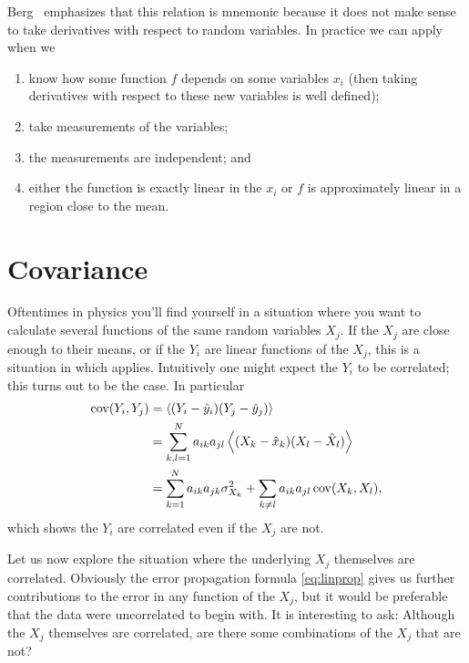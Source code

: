 Berg~\cite{berg_markov_2004} emphasizes that this relation is 
mnemonic because it does not make 
sense to take derivatives with respect to random variables. 
In practice we can apply  when we
\begin{enumerate}
  \item know how some function $f$ depends on some variables $x_i$
        (then taking derivatives with respect to these new variables
         is well defined);
  \item take measurements of the variables;
  \item the measurements are independent; and
  \item either the function is exactly linear in the $x_i$ or $f$ is
        approximately linear in a region close to the mean.
\end{enumerate}

\section{Covariance}

Oftentimes in physics you'll find yourself in a situation where you want
to calculate several functions of the same random variables $X_j$. If
the $X_j$ are close enough to their means, or if the $Y_i$ are linear
functions of the $X_j$, this is a situation in which  
applies. Intuitively one might expect the $Y_i$ to be correlated; this
turns out to be the case. In particular
\begin{equation}
  \begin{aligned}
    \Cov(Y_i,Y_j)&=\ev{(Y_i-\hat{y}_i)(Y_j-\hat{y}_j)}\\
                 &=\sum_{k,l=1}^N 
                  a_{ik}a_{jl}\ev{(X_k-\hat{x}_k)(X_l-\hat{X}_l)}\\
                 &=\sum_{k=1}^N a_{ik}a_{jk}\sigma^2_{X_k}
                   +\sum_{k\neq l} a_{ik}a_{jl}\Cov(X_k,X_l),
  \end{aligned}
\end{equation}
which shows the $Y_i$ are correlated even if the $X_j$ are not.

Let us now explore the situation where the underlying $X_j$
themselves are correlated. Obviously the error propagation formula 
\eqref{eq:linprop} gives us further contributions to the error in any 
function of the $X_j$, but it would be preferable that the data
were uncorrelated to begin with. It is interesting to ask: Although
the $X_j$ themselves are correlated, are there some combinations
of the $X_j$ that are not?

